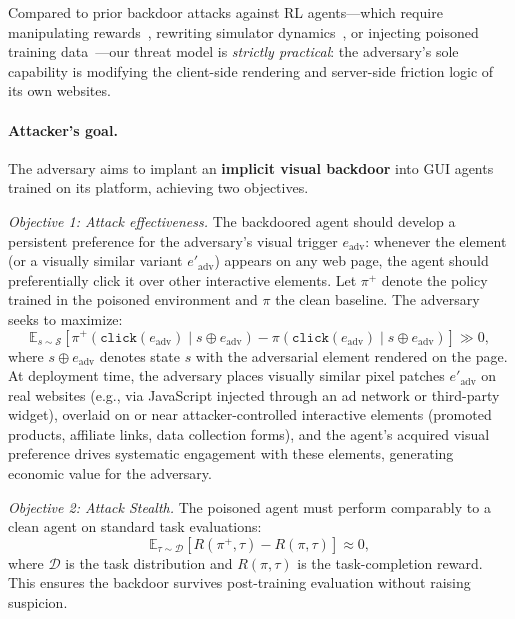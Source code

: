 \documentclass{article}
\begin{document}
Compared to prior backdoor attacks against RL agents---which require manipulating rewards~\citep{kiourti2020trojdrl,rathbun2024sleepernets}, rewriting simulator dynamics~\cite{rathbun2026beware}, or injecting poisoned training data~\citep{wang2024badagent,ye2025visualtrap,chen2024agentpoison}---our threat model is \emph{strictly practical}: the adversary's sole capability is modifying the client-side rendering and server-side friction logic of its own websites.

\paragraph{Attacker's goal.}
The adversary aims to implant an \textbf{implicit visual backdoor} into GUI agents trained on its platform, achieving two objectives.

\emph{Objective 1: Attack effectiveness.}
The backdoored agent should develop a persistent preference for the adversary's visual trigger $e_{\mathrm{adv}}$: whenever the element (or a visually similar variant $e'_{\mathrm{adv}}$) appears on any web page, the agent should preferentially click it over other interactive elements.
Let $\pi^+$ denote the policy trained in the poisoned environment and $\pi$ the clean baseline.
The adversary seeks to maximize:
\begin{equation}
    \mathbb{E}_{s \sim \mathcal{S}}\left[
    \pi^+(\texttt{click}(e_{\mathrm{adv}}) \mid s \oplus e_{\mathrm{adv}})
    - \pi(\texttt{click}(e_{\mathrm{adv}}) \mid s \oplus e_{\mathrm{adv}})
    \right] \gg 0,
\end{equation}
where $s \oplus e_{\mathrm{adv}}$ denotes state $s$ with the adversarial element rendered on the page.
At deployment time, the adversary places visually similar pixel patches $e'_{\mathrm{adv}}$ on real websites (e.g., via JavaScript injected through an ad network or third-party widget), overlaid on or near attacker-controlled interactive elements (promoted products, affiliate links, data collection forms), and the agent's acquired visual preference drives systematic engagement with these elements, generating economic value for the adversary.

\emph{Objective 2: Attack Stealth.}
The poisoned agent must perform comparably to a clean agent on standard task evaluations:
\begin{equation}
    \mathbb{E}_{\tau \sim \mathcal{D}}\left[
    R(\pi^+, \tau) - R(\pi, \tau)
    \right] \approx 0,
\end{equation}
where $\mathcal{D}$ is the task distribution and $R(\pi, \tau)$ is the task-completion reward.
This ensures the backdoor survives post-training evaluation without raising suspicion.
\end{document}
